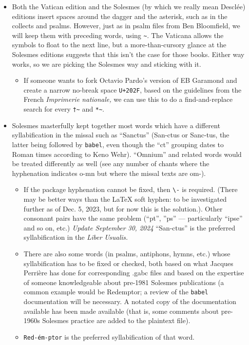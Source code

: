 \documentclass[11pt]{article}
\begin{document}
\begin{itemize}
\begin{itemize}
 The psalm files from Ben Bloomfield do not have an extra, manually-inserted space, and we aim to keep it that way.
\item
We will let \LaTeX{}\ (well, \verb|babel|) do its thing with other double punctuation marks: no other intervention should be needed. This also saves quite a bit of space on the page (unfortunately at a premium): this is the best compromise between American/Anglo and French usage.
\end{itemize}
\item
Both the Vatican edition and the Solesmes (by which we really mean Desclée) editions insert spaces around the dagger and the asterisk, such as in the collects and psalms. However, just as in psalm files from Ben Bloomfield, we will keep them with preceding words, using \verb|~|. The Vaticana allows the symbols to float to the next line, but  a more-than-cursory glance at the Solesmes editions suggests that this isn't the case for those books. Either way works, so we are picking the Solesmes way and sticking with it.
 \begin{itemize}
\item
If someone wants to fork Octavio Pardo's version of EB Garamond and create a narrow no-break space \verb|U+202F|, based on the guidelines from the French \textit{Imprimerie nationale,} we can use this to do a find-and-replace search for every \verb|†~| and \verb|*~|.
\end{itemize}
\item
Solesmes masterfully kept together most words which have a different syllabification in the missal such as ``Sanctus'' (San-ctus or Sanc-tus, the latter being followed by \verb|babel|, even though the ``ct'' grouping dates to Roman times according to Keno Wehr). ``Omnium'' and related words would be treated differently as well (see any number of chants where the hyphenation indicates o-mn but where the missal texts are om-).
 \begin{itemize}
 \item
  If the package hyphenation cannot be fixed, then \verb|\-| is required. (There may be better ways than the LaTeX{} soft hyphen: to be investigated further as of Dec. 5, 2023, but for now this is the solution.). Other consonant pairs have the same problem (``pt'', ''ps'' — particularly ``ipse'' and so on, etc.) \emph{Update September 30, 2024} ``San-ctus'' is the preferred syllabification in the \textit{Liber Usualis.} 

\item
There are also some words (in psalms, antiphons, hymns, etc.) whose syllabification has to be fixed or checked, both based on what Jacques Perrière has done for corresponding .gabc files and based on the expertise of someone knowledgeable about pre-1981 Solesmes publications (a common example would be Redemptor; a review of the \verb|babel| documentation will be necessary. A notated copy of the documentation available has been made available (that is, some comments about pre-1960s Solesmes practice are added to the plaintext file).
 \item
\verb|Red-ém-ptor| is the preferred syllabification of that word.
\end{itemize}


\end{itemize}
\end{document}
